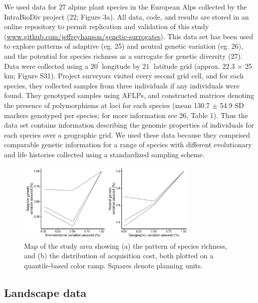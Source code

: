 \documentclass[9pt,twocolumn,twoside,lineno]{pnas-new}
\begin{document}
We used data for 27 alpine plant species in the European Alps collected
by the IntraBioDiv project (22; Figure 3a). All data, code, and results
are stored in an online repository to permit replication and validation
of this study (\url{www.github.com/jeffreyhanson/genetic-surrogates}).
This data set has been used to explore patterns of adaptive (eg. 25) and
neutral genetic variation (eg. 26), and the potential for species
richness as a surrogate for genetic diversity (27). Data were collected
using a \(20^{\prime}\) longitude by \(21^{\prime}\) latitude grid
(approx. 22.3 \(\times\) 25 km; Figure S31). Project surveyors visited
every second grid cell, and for each species, they collected samples
from three individuals if any individuals were found. They genotyped
samples using AFLPs, and constructed matrices denoting the presence of
polymorphisms at loci for each species (mean 130.7 \(\pm\) 54.9 SD
markers genotyped per species; for more information see 26, Table 1).
Thus the data set contains information describing the genomic properties
of individuals for each species over a geographic grid. We used these
data because they comprised comparable genetic information for a range
of species with different evolutionary and life histories collected
using a standardized sampling scheme.

\begin{figure}

{\centering \includegraphics[width=3.42in]{article_files/figure-latex/unnamed-chunk-5-1.pdf} 

}

\caption{Map of the study area showing (a) the pattern of species richness, and (b) the distribution of acquisition cost, both plotted on a quantile-based color ramp. Squares denote planning units.}\label{fig:unnamed-chunk-5}
\end{figure}

\subsection*{Landscape data}\label{landscape-data}
\end{document}
